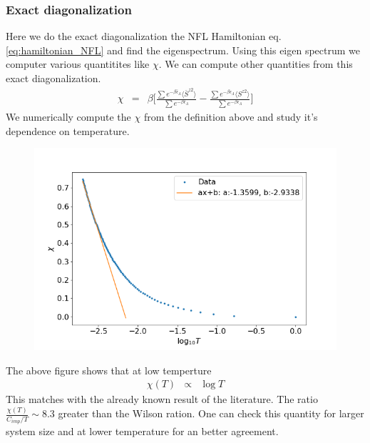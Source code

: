 \documentclass[reprint,prb,superscriptaddress]{revtex4-1}
\begin{document}
\subsubsection{Exact diagonalization}
Here we do the exact diagonalization the NFL Hamiltonian eq.\eqref{eq:hamiltonian_NFL} and find the eigenspectrum. Using this eigen spectrum  we computer various quantitites like $\chi$. We can compute other quantities from this exact diagonalization. 
\begin{eqnarray}
\chi &=& \beta\bigg[\frac{\sum e^{-\beta \bar{\epsilon}_{\Lambda}} \langle \bar{S}^{z2} \rangle}{\sum e^{-\beta \bar{\epsilon}_{\Lambda}} } -\frac{\sum e^{-\beta \epsilon_{\Lambda}} \langle S^{z2 }\rangle }{\sum e^{-\beta \epsilon_{\Lambda}} } \bigg] 
\end{eqnarray}
We numerically compute the $\chi$ from the definition above and study it's dependence on temperature.
\begin{figure}[!h]
\centering
\includegraphics[scale=0.36]{plt/NFL_Chi_log_0p1}
\end{figure}
The above figure shows that at low temperture
\begin{eqnarray}
\chi(T) &\propto& \log T
\end{eqnarray}
This matches with the already known result of the literature. The ratio $\frac{\chi(T)}{C_{imp}/T} \sim 8.3$ greater than the Wilson ration. One can check this quantity for larger system size and at lower temperature for an better agreement.
\end{document}
